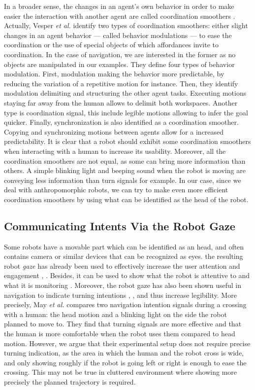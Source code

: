 \documentclass[a4paper,11pt,twoside]{StyleThese}
\begin{document}
In a broader sense, the changes in an agent's own behavior in order to make easier the interaction with another agent are called coordination smoothers \cite{vesper_minimal_2010}. Actually, Vesper \textit{et al.} identify two types of coordination smoothers: either slight changes in an agent behavior --- called behavior modulations --- to ease the coordination or the use of special objects of which affordances invite to coordination. In the case of navigation, we are interested in the former as no objects are manipulated in our examples. They define four types of behavior modulation. First, modulation making the behavior more predictable, by reducing the variation of a repetitive motion for instance. Then, they identify modulation delimiting and structuring the other agent tasks. Executing motions staying far away from the human allows to delimit both workspaces. Another type is coordination signal, this include legible motions allowing to infer the goal quicker. Finally, synchronization is also identified as a coordination smoother. Copying and synchronizing motions between agents allow for a increased predictability. It is clear that a robot should exhibit some coordination smoothers when interacting with a human to increase its usability. Moreover, all the coordination smoothers are not equal, as some can bring more information than others. A simple blinking light and beeping sound when the robot is moving are conveying less information than turn signals for example. In our case, since we deal with anthropomorphic robots, we can try to make even more efficient coordination smoothers by using what can be identified as the head of the robot.

\subsection{Communicating Intents Via the Robot Gaze}
Some robots have a movable part which can be identified as an head, and often contains camera or similar devices that can be recognized as eyes. the resulting robot \textit{gaze} has already been used to effectively increase the user attention and engagement \cite{mutlu_storytelling_2006}, \cite{zaraki_designing_2014}. Besides, it can be used to show what the robot is attentive to and what it is monitoring \cite{breazeal2005effects}. Moreover, the robot gaze has also been shown useful in navigation to indicate turning intentions \cite{lu_towards_2013}, \cite{may_show_2015}, and thus increase legibility. More precisely, May \textit{et al.} compares two navigation intention signals during a crossing with a human: the head motion and a blinking light on the side the robot planned to move to. They find that turning signals are more effective and that the human is more comfortable when the robot uses them compared to head motion. However, we argue that their experimental setup does not require precise turning indication, as the area in which the human and the robot cross is wide, and only showing roughly if the robot is going left or right is enough to ease the crossing. This may not be true in cluttered environment where showing more precisely the planned trajectory is required. 
\end{document}
